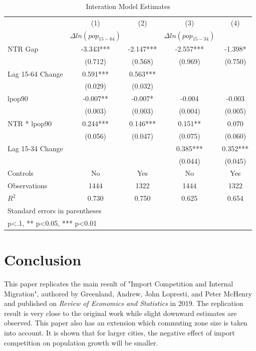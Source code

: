 \documentclass[12pt, final]{CSP}
\begin{document}
\begin{table}[htbp]\centering
\def\sym#1{\ifmmode^{#1}\else\(^{#1}\)\fi}
\caption{Interation Model Estimates}
\begin{tabular}{l*{4}{c}}
\toprule
\hline
\hline 
&\multicolumn{1}{c}{(1)}&\multicolumn{1}{c}{(2)}&\multicolumn{1}{c}{(3)}&\multicolumn{1}{c}{(4)}\\
&\multicolumn{1}{c}{$\Delta ln(pop_{15-64})$}&\multicolumn{1}{c}{}&\multicolumn{1}{c}{$\Delta ln(pop_{15-34})$}&\multicolumn{1}{c}{}\\
\hline 
\midrule
NTR Gap             &   -3.343***&   -2.147***&   -2.557***&   -1.398*  \\
                    &  (0.712)   &  (0.568)   &  (0.969)   &  (0.750)   \\
\addlinespace
Lag 15-64 Change    &    0.591***&    0.563***&            &            \\
                    &  (0.029)   &  (0.032)   &            &            \\
\addlinespace
lpop90             &   -0.007** &   -0.007*  &   -0.004   &   -0.003   \\
                    &  (0.003)   &  (0.003)   &  (0.004)   &  (0.005)   \\
\addlinespace
NTR * lpop90            &    0.244***&    0.146***&    0.151** &    0.070   \\
                    &  (0.056)   &  (0.047)   &  (0.075)   &  (0.060)   \\
\addlinespace
Lag 15-34 Change    &            &            &    0.385***&    0.352***\\
                    &            &            &  (0.044)   &  (0.045)   \\
Controls      &        No  &        Yes   &        No   &        Yes   \\
\midrule
Observations        &     1444   &     1322   &     1444   &     1322   \\
\(R^{2}\)           &    0.730   &    0.750   &    0.625   &    0.654   \\
\hline
\bottomrule
\multicolumn{5}{l}{\footnotesize Standard errors in parentheses}\\
\multicolumn{5}{l}{\footnotesize * p<.1, ** p<0.05, *** p<0.01}\\
\end{tabular}
\end{table}



\section{Conclusion}
\noindent
This paper replicates the main result of "Import Competition and Internal Migration"\cite{greenland2019import}, authored by Greenland, Andrew, John Lopresti, and Peter McHenry and published on \textit{Review of Economics and Statistics} in 2019. The replication result is very close to the original work while slight downward estimates are observed. This paper also has an extension which commuting zone size is taken into account. It is shown that for larger cities, the negative effect of import competition on population growth will be smaller.  

\clearpage 
\it

\end{document}
